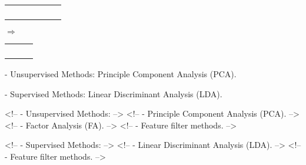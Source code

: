 \begin{center}
\begin{tabular}{ | c | c | c | c | c | c |}
    \hline
      & & & & & \\ \hline
      & & & & & \\ \hline
      & & & & & \\ \hline
      & & & & & \\ \hline
      & & & & & \\
    \hline
  \end{tabular} $\Rightarrow$
    \begin{tabular}{ | c | c | c |}
    \hline
      & &  \\ \hline
      & &  \\ \hline
      & &  \\ \hline
      & &  \\ \hline
      & &  \\
    \hline
  \end{tabular}
\end{center}

- Unsupervised Methods: Principle Component Analysis (PCA).

- Supervised Methods: Linear Discriminant Analysis (LDA).

<!-- - Unsupervised Methods: -->
<!--     - Principle Component Analysis (PCA). -->
<!--     - Factor Analysis (FA). -->
<!--     - Feature filter methods. -->

<!-- - Supervised Methods: -->
<!--     - Linear Discriminant Analysis (LDA). -->
<!--     - Feature filter methods. -->
